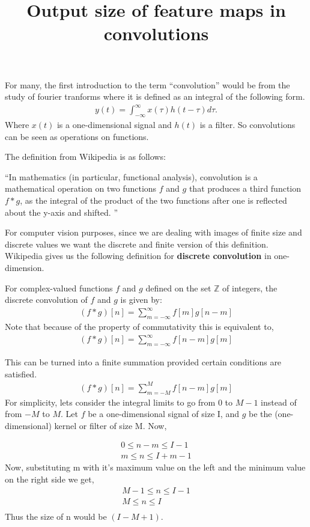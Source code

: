 \documentclass{../template/texnote}
\title{Output size of feature maps in convolutions}
\begin{document}
    \maketitle {}
For many, the first introduction to the term ``convolution'' would be from the study of fourier tranforms where it is defined as an integral of the following form.
\begin{align*}
y(t) = \int^{\infty}_{-\infty} x(\tau)h(t-\tau)d\tau.
\end{align*}
Where \(x(t)\) is a one-dimensional signal and \(h(t)\) is a filter.
So convolutions can be seen as operations on functions.

The definition from Wikipedia is as follows:

``In mathematics (in particular, functional analysis), convolution is a mathematical operation on two functions 
\(f\) and \(g\) that produces a third function \( f\ast g\), as the integral of the product of the two functions after one is reflected about the y-axis and shifted.
''

For computer vision purposes, since we are dealing with images of finite size and discrete values we want the discrete and finite version of this definition.
Wikipedia gives us the following definition for \textbf{discrete convolution} in one-dimension.


For complex-valued functions \(f\) and \(g\) defined on the set \(\mathbb{Z}\) of integers, the discrete convolution of \(f\) and \(g\) is given by:
\begin{align*}
	(f \ast g )[n]= \sum_{m=-\infty}^{\infty} f[m]g[n-m]
\end{align*}
Note that because of the property of commutativity this is equivalent to,
\begin{align*}
	(f \ast g)[n] = \sum_{m=-\infty}^{\infty} f[n-m]g[m]
\end{align*}

This can be turned into a finite summation provided certain conditions are satisfied.
\begin{align*}
	(f \ast g)[n] = \sum_{m=-M}^{M} f[n-m]g[m]
\end{align*}
For simplicity, lets consider the integral limits to go from \(0\) to \(M-1\) instead of from \(-M\) to \(M\).
Let \(f\) be a one-dimensional signal of size I, and \(g\) be the (one-dimensional) kernel or filter of size M.
Now, %

\begin{align*}
	0 \leq n -m  \leq I-1 \\
	m \leq n \leq I + m -1
\end{align*}
Now, substituting m with it's maximum value on the left and the minimum value on the right side we get,
\begin{align*}
	M-1 \leq n  \leq I-1 \\
	M \leq n  \leq I \\
\end{align*}
Thus the size of n would be \((I-M+1)\).
\end{document}
